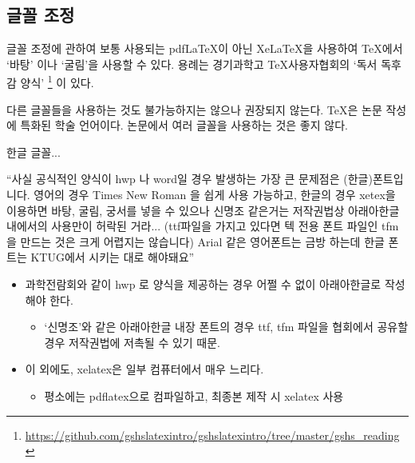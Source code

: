 \documentclass[12pt]{beamer}
\begin{document}
\subsection{글꼴 조정}
\begin{frame}{글꼴 조정에 관하여}
	보통 사용되는 pdf\LaTeX 이 아닌 Xe\LaTeX 을 사용하여 \TeX 에서 `바탕' 이나 `굴림'을 사용할 수 있다. 용례는 경기과학고 \TeX 사용자협회의 `독서 독후감 양식' \footnote{\url{https://github.com/gshslatexintro/gshslatexintro/tree/master/gshs_reading}} 이 있다. 
	\vspace{1cm}
	
	다른 글꼴들을 사용하는 것도 불가능하지는 않으나 권장되지 않는다. \TeX 은 논문 작성에 특화된 학술 언어이다. 논문에서 여러 글꼴을 사용하는 것은 좋지 않다.
\end{frame}
\begin{frame}{한글 글꼴...}
	\begin{scriptsize}
		``사실 공식적인 양식이 hwp 나 word일 경우 발생하는 가장 큰 문제점은 (한글)폰트입니다. 영어의 경우 Times New Roman 을 쉽게 사용 가능하고, 한글의 경우 xetex을 이용하면 바탕, 굴림, 궁서를 넣을 수 있으나 신명조 같은거는 저작권법상 아래아한글 내에서의 사용만이 허락된 거라... (ttf파일을 가지고 있다면 텍 전용 폰트 파일인 tfm을 만드는 것은 크게 어렵지는 않습니다)  Arial 같은 영어폰트는 금방 하는데 한글 폰트는 KTUG에서 시키는 대로 해야돼요'' %
	\end{scriptsize}
	\small
	\begin{itemize}
		\item 과학전람회와 같이 hwp 로 양식을 제공하는 경우 어쩔 수 없이 아래아한글로 작성해야 한다.
		\begin{itemize}
			\item `신명조'와 같은 아래아한글 내장 폰트의 경우 ttf, tfm 파일을 협회에서 공유할 경우 저작권법에 저촉될 수 있기 때문.
		\end{itemize}
		\item 이 외에도, xelatex은 일부 컴퓨터에서 매우 느리다.
		\begin{itemize}
			\item 평소에는 pdflatex으로 컴파일하고, 최종본 제작 시 xelatex 사용
		\end{itemize}
	\end{itemize}
\end{frame}
\end{document}
